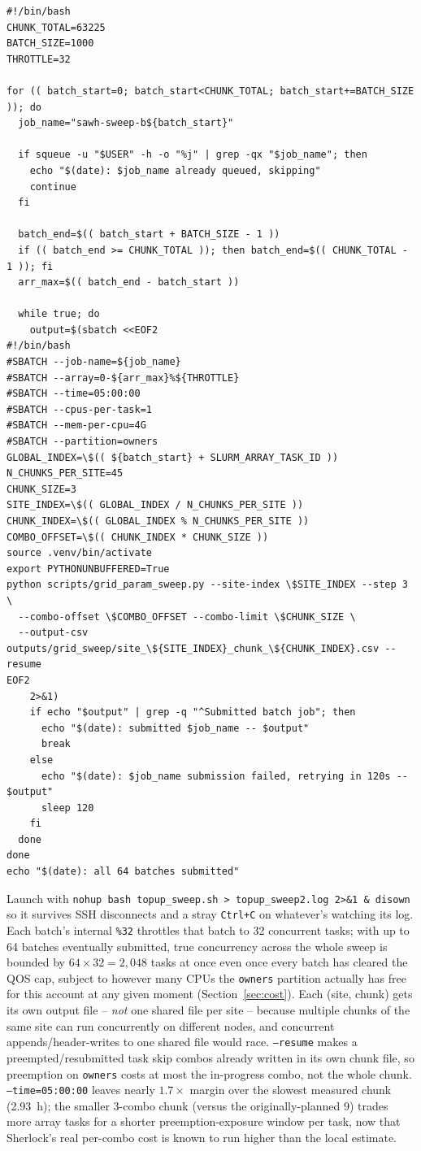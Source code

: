 \documentclass[11pt]{article}
\begin{document}
\begin{verbatim}
#!/bin/bash
CHUNK_TOTAL=63225
BATCH_SIZE=1000
THROTTLE=32

for (( batch_start=0; batch_start<CHUNK_TOTAL; batch_start+=BATCH_SIZE )); do
  job_name="sawh-sweep-b${batch_start}"

  if squeue -u "$USER" -h -o "%j" | grep -qx "$job_name"; then
    echo "$(date): $job_name already queued, skipping"
    continue
  fi

  batch_end=$(( batch_start + BATCH_SIZE - 1 ))
  if (( batch_end >= CHUNK_TOTAL )); then batch_end=$(( CHUNK_TOTAL - 1 )); fi
  arr_max=$(( batch_end - batch_start ))

  while true; do
    output=$(sbatch <<EOF2
#!/bin/bash
#SBATCH --job-name=${job_name}
#SBATCH --array=0-${arr_max}%${THROTTLE}
#SBATCH --time=05:00:00
#SBATCH --cpus-per-task=1
#SBATCH --mem-per-cpu=4G
#SBATCH --partition=owners
GLOBAL_INDEX=\$(( ${batch_start} + SLURM_ARRAY_TASK_ID ))
N_CHUNKS_PER_SITE=45
CHUNK_SIZE=3
SITE_INDEX=\$(( GLOBAL_INDEX / N_CHUNKS_PER_SITE ))
CHUNK_INDEX=\$(( GLOBAL_INDEX % N_CHUNKS_PER_SITE ))
COMBO_OFFSET=\$(( CHUNK_INDEX * CHUNK_SIZE ))
source .venv/bin/activate
export PYTHONUNBUFFERED=True
python scripts/grid_param_sweep.py --site-index \$SITE_INDEX --step 3 \
  --combo-offset \$COMBO_OFFSET --combo-limit \$CHUNK_SIZE \
  --output-csv outputs/grid_sweep/site_\${SITE_INDEX}_chunk_\${CHUNK_INDEX}.csv --resume
EOF2
    2>&1)
    if echo "$output" | grep -q "^Submitted batch job"; then
      echo "$(date): submitted $job_name -- $output"
      break
    else
      echo "$(date): $job_name submission failed, retrying in 120s -- $output"
      sleep 120
    fi
  done
done
echo "$(date): all 64 batches submitted"
\end{verbatim}

Launch with \texttt{nohup bash topup\_sweep.sh > topup\_sweep2.log 2>\&1 \& disown} so it survives
SSH disconnects and a stray \texttt{Ctrl+C} on whatever's watching its log. Each batch's internal
\texttt{\%32} throttles that batch to 32 concurrent tasks; with up to 64 batches eventually
submitted, true concurrency across the whole sweep is bounded by
$64 \times 32 = 2{,}048$ tasks at once even once every batch has cleared the QOS cap, subject to
however many CPUs the \texttt{owners} partition actually has free for this account at any given
moment (Section~\ref{sec:cost}). Each (site, chunk) gets its own output file -- \emph{not} one
shared file per site -- because multiple chunks of the same site can run concurrently on
different nodes, and concurrent appends/header-writes to one shared file would race.
\texttt{--resume} makes a preempted/resubmitted task skip combos already written in its own chunk
file, so preemption on \texttt{owners} costs at most the in-progress combo, not the whole chunk.
\texttt{--time=05:00:00} leaves nearly $1.7\times$ margin over the slowest measured chunk
(\SI{2.93}{\hour}); the smaller 3-combo chunk (versus the originally-planned 9) trades more array
tasks for a shorter preemption-exposure window per task, now that Sherlock's real per-combo cost
is known to run higher than the local estimate.
\end{document}
